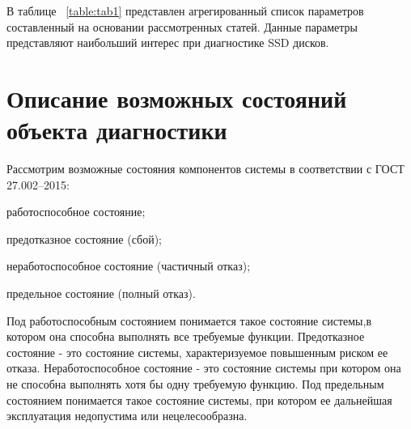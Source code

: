 В таблице  ~\ref{table:tab1} представлен агрегированный список параметров составленный на основании рассмотренных статей. Данные параметры представляют наибольший интерес при диагностике SSD дисков. 

\section{Описание возможных состояний объекта диагностики}
Рассмотрим возможные состояния компонентов системы в соответствии с ГОСТ 27.002–2015:
\begin{itemize*}
	\item{работоспособное состояние;}
	\item{предотказное состояние (сбой);}
	\item{неработоспособное состояние (частичный отказ);}
	\item{предельное состояние (полный отказ).}
\end{itemize*}
Под работоспособным состоянием понимается такое состояние системы,в котором она способна выполнять все требуемые функции. 
Предотказное состояние - это состояние системы, характеризуемое повышенным риском ее отказа. 
Неработоспособное состояние - это состояние системы при котором она не способна выполнять хотя бы одну требуемую функцию.
Под предельным состоянием понимается такое состояние системы, при котором ее дальнейшая эксплуатация недопустима или нецелесообразна. 

